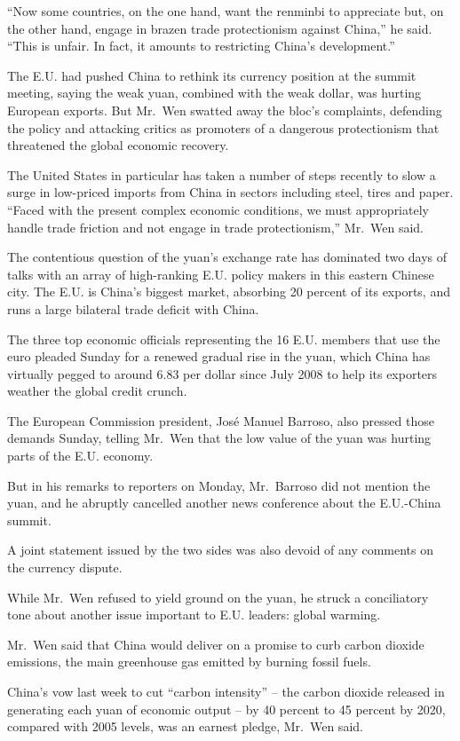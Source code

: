 ﻿\documentclass[12pt]{article}
\begin{document}
``Now some countries, on the one hand, want the renminbi to appreciate but, on the other hand,
engage in brazen trade protectionism against China,'' he said. ``This is unfair. In fact, it amounts
to restricting China's development.''

The E.U. had pushed China to rethink its currency position at the summit meeting, saying the weak
yuan, combined with the weak dollar, was hurting European exports. But Mr.~Wen swatted away the
bloc's complaints, defending the policy and attacking critics as promoters of a dangerous
protectionism that threatened the global economic recovery.

The United States in particular has taken a number of steps recently to slow a surge in low-priced
imports from China in sectors including steel, tires and paper. ``Faced with the present complex
economic conditions, we must appropriately handle trade friction and not engage in trade
protectionism,'' Mr.~Wen said.

The contentious question of the yuan's exchange rate has dominated two days of talks with an array
of high-ranking E.U. policy makers in this eastern Chinese city. The E.U. is China's biggest market,
absorbing 20 percent of its exports, and runs a large bilateral trade deficit with China.

The three top economic officials representing the 16 E.U. members that use the euro pleaded Sunday
for a renewed gradual rise in the yuan, which China has virtually pegged to around 6.83 per dollar
since July 2008 to help its exporters weather the global credit crunch.

The European Commission president, Jos\'e Manuel Barroso, also pressed those demands Sunday, telling
Mr.~Wen that the low value of the yuan was hurting parts of the E.U. economy.

But in his remarks to reporters on Monday, Mr.~Barroso did not mention the yuan, and he abruptly
cancelled another news conference about the E.U.-China summit.

A joint statement issued by the two sides was also devoid of any comments on the currency dispute.

While Mr.~Wen refused to yield ground on the yuan, he struck a conciliatory tone about another issue
important to E.U. leaders: global warming.

Mr.~Wen said that China would deliver on a promise to curb carbon dioxide emissions, the main
greenhouse gas emitted by burning fossil fuels.

China's vow last week to cut ``carbon intensity'' -- the carbon dioxide released in generating each
yuan of economic output -- by 40 percent to 45 percent by 2020, compared with 2005 levels, was an
earnest pledge, Mr.~Wen said.
\end{document}
